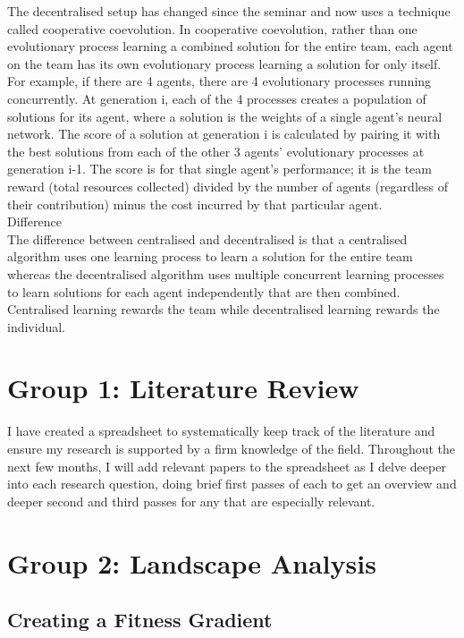 \documentclass[12pt]{article}
\begin{document}
The decentralised setup has changed since the seminar and now uses a technique called cooperative coevolution. In cooperative coevolution, rather than one evolutionary process learning a combined solution for the entire team, each agent on the team has its own evolutionary process learning a solution for only itself. For example, if there are 4 agents, there are 4 evolutionary processes running concurrently. At generation i, each of the 4 processes creates a population of solutions for its agent, where a solution is the weights of a single agent’s neural network. The score of a solution at generation i is calculated by pairing it with the best solutions from each of the other 3 agents’ evolutionary processes at generation i-1. The score is for that single agent’s performance; it is the team reward (total resources collected) divided by the number of agents (regardless of their contribution) minus the cost incurred by that particular agent.\\

Difference\\

The difference between centralised and decentralised is that a centralised algorithm uses one learning process to learn a solution for the entire team whereas the decentralised algorithm uses multiple concurrent learning processes to learn solutions for each agent independently that are then combined. Centralised learning rewards the team while decentralised learning rewards the individual.\\


\section{Group 1: Literature Review}

I have created a spreadsheet to systematically keep track of the literature and ensure my research is supported by a firm knowledge of the field. Throughout the next few months, I will add relevant papers to the spreadsheet as I delve deeper into each research question, doing brief first passes of each to get an overview and deeper second and third passes for any that are especially relevant.

\section{Group 2: Landscape Analysis}

\subsection{Creating a Fitness Gradient}
\end{document}
